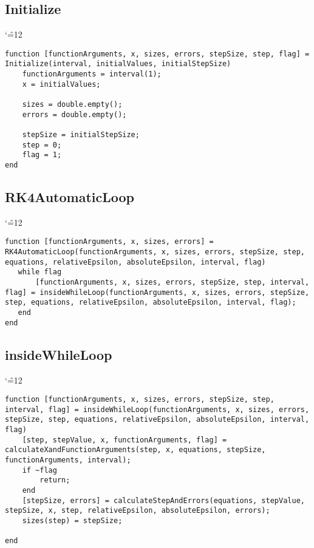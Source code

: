 \documentclass[12pt]{report}
\newenvironment{simplechar}{%
   \catcode`\^=12
}{}
\begin{document}
\subsection{Initialize}
\begin{simplechar}
\begin{lstlisting}
function [functionArguments, x, sizes, errors, stepSize, step, flag] = Initialize(interval, initialValues, initialStepSize)
    functionArguments = interval(1);
    x = initialValues;

    sizes = double.empty();
    errors = double.empty();

    stepSize = initialStepSize;
    step = 0;
    flag = 1;
end
\end{lstlisting}
\end{simplechar}

\subsection{RK4AutomaticLoop}
\begin{simplechar}
\begin{lstlisting}
function [functionArguments, x, sizes, errors] = RK4AutomaticLoop(functionArguments, x, sizes, errors, stepSize, step, equations, relativeEpsilon, absoluteEpsilon, interval, flag)
   while flag
       [functionArguments, x, sizes, errors, stepSize, step, interval, flag] = insideWhileLoop(functionArguments, x, sizes, errors, stepSize, step, equations, relativeEpsilon, absoluteEpsilon, interval, flag);
   end
end
\end{lstlisting}
\end{simplechar}

\subsection{insideWhileLoop}
\begin{simplechar}
\begin{lstlisting}
function [functionArguments, x, sizes, errors, stepSize, step, interval, flag] = insideWhileLoop(functionArguments, x, sizes, errors, stepSize, step, equations, relativeEpsilon, absoluteEpsilon, interval, flag)
    [step, stepValue, x, functionArguments, flag] = calculateXandFunctionArguments(step, x, equations, stepSize, functionArguments, interval);
    if ~flag
        return;
    end
    [stepSize, errors] = calculateStepAndErrors(equations, stepValue, stepSize, x, step, relativeEpsilon, absoluteEpsilon, errors);
    sizes(step) = stepSize;

end
\end{lstlisting}
\end{simplechar}
\end{document}
